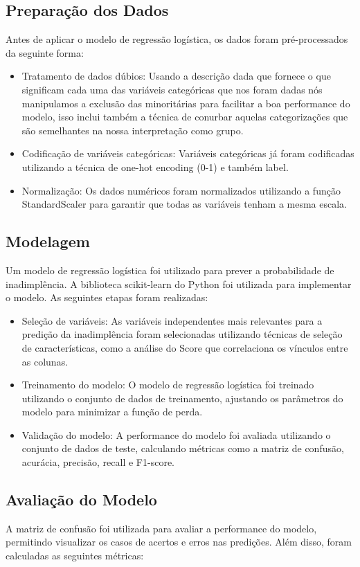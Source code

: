 \documentclass{abntpuc}
\begin{document}
\subsection{Preparação dos Dados}
Antes de aplicar o modelo de regressão logística, os dados foram pré-processados da seguinte forma:
\begin{itemize}
    \item Tratamento de dados dúbios: Usando a descrição dada que fornece o que significam cada uma das variáveis categóricas que nos foram dadas nós manipulamos a exclusão das minoritárias para facilitar a boa performance do modelo, isso inclui também a técnica de conurbar aquelas categorizações que são semelhantes na nossa interpretação como grupo.
    \item Codificação de variáveis categóricas: Variáveis categóricas já foram codificadas utilizando a técnica de one-hot encoding (0-1) e também label.
    \item Normalização: Os dados numéricos foram normalizados utilizando a função StandardScaler para garantir que todas as variáveis tenham a mesma escala.
\end{itemize}

\subsection{Modelagem}
Um modelo de regressão logística foi utilizado para prever a probabilidade de inadimplência. A biblioteca scikit-learn do Python foi utilizada para implementar o modelo. As seguintes etapas foram realizadas:

\begin{itemize}
    \item Seleção de variáveis: As variáveis independentes mais relevantes para a predição da inadimplência foram selecionadas utilizando técnicas de seleção de características, como a análise do Score que correlaciona os vínculos entre as colunas.
    \item Treinamento do modelo: O modelo de regressão logística foi treinado utilizando o conjunto de dados de treinamento, ajustando os parâmetros do modelo para minimizar a função de perda.
    \item Validação do modelo: A performance do modelo foi avaliada utilizando o conjunto de dados de teste, calculando métricas como a matriz de confusão, acurácia, precisão, recall e F1-score.
\end{itemize}

\subsection{Avaliação do Modelo}
A matriz de confusão foi utilizada para avaliar a performance do modelo, permitindo visualizar os casos de acertos e erros nas predições. Além disso, foram calculadas as seguintes métricas:
\end{document}

